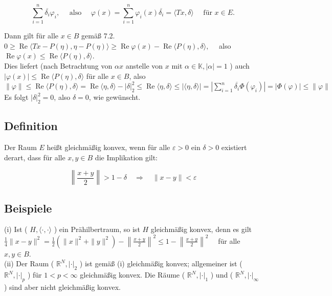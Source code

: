 \documentclass[10pt, letterpaper]{article}
\begin{document}
$$
\sum_{i=1}^{n} \overline{\delta_{i}} \varphi_{i}, \quad \text { also } \quad \varphi(x)=\sum_{i=1}^{n} \varphi_{i}(x) \overline{\delta_{i}}=\langle T x, \delta\rangle \quad \text { für } x \in E .
$$

Dann gilt für alle $x \in B$ gemäß 7.2.\\
$0 \geq \operatorname{Re}\langle T x-P(\eta), \eta-P(\eta)\rangle \geq \operatorname{Re} \varphi(x)-\operatorname{Re}\langle P(\eta), \delta\rangle, \quad$ also $\operatorname{Re} \varphi(x) \leq \operatorname{Re}\langle P(\eta), \delta\rangle$.\\
Dies liefert (nach Betrachtung von $\alpha x$ anstelle von $x$ mit $\alpha \in \mathbb{K},|\alpha|=1$ ) auch $|\varphi(x)| \leq \operatorname{Re}\langle P(\eta), \delta\rangle$ für alle $x \in B$, also\\
$\|\varphi\| \leq \operatorname{Re}\langle P(\eta), \delta\rangle=\operatorname{Re}\langle\eta, \delta\rangle-|\delta|_{2}^{2} \leq \operatorname{Re}\langle\eta, \delta\rangle \leq|\langle\eta, \delta\rangle|=\left|\sum_{i=1}^{n} \overline{\delta_{i}} \Phi\left(\varphi_{i}\right)\right|=|\Phi(\varphi)| \leq\|\varphi\|$\\
Es folgt $|\delta|_{2}^{2}=0$, also $\delta=0$, wie gewünscht.

\subsection*{Definition}
Der Raum $E$ heißt gleichmäßig konvex, wenn für alle $\varepsilon>0$ ein $\delta>0$ existiert derart, dass für alle $x, y \in B$ die Implikation gilt:

$$
\left\|\frac{x+y}{2}\right\|>1-\delta \quad \Longrightarrow \quad\|x-y\|<\varepsilon
$$

\subsection*{Beispiele}
(i) Ist ( $H,\langle\cdot, \cdot\rangle$ ) ein Prähilbertraum, so ist $H$ gleichmäßig konvex, denn es gilt $\frac{1}{4}\|x-y\|^{2}=\frac{1}{2}\left(\|x\|^{2}+\|y\|^{2}\right)-\left\|\frac{x+y}{2}\right\|^{2} \leq 1-\left\|\frac{x+y}{2}\right\|^{2} \quad$ für alle $x, y \in B$.\\
(ii) Der Raum ( $\mathbb{R}^{N},|\cdot|_{2}$ ) ist gemäß (i) gleichmäßig konvex; allgemeiner ist ( $\mathbb{R}^{N},|\cdot|_{p}$ ) für $1<p<\infty$ gleichmäßig konvex. Die Räume ( $\mathbb{R}^{N},|\cdot|_{1}$ ) und ( $\mathbb{R}^{N},|\cdot|_{\infty}$ ) sind aber nicht gleichmäßig konvex.
\end{document}
